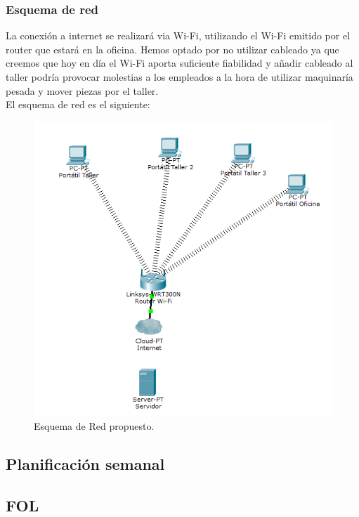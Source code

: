 \documentclass{article}
\begin{document}
\subsubsection{Esquema de red}
La conexión a internet se realizará via Wi-Fi, utilizando el Wi-Fi emitido por el router que estará en la oficina. Hemos optado 
por no utilizar cableado ya que creemos que hoy en día el Wi-Fi aporta suficiente fiabilidad y añadir cableado al taller podría provocar molestias a los empleados a la hora de utilizar 
maquinaría pesada y mover piezas por el taller.\\ 
El esquema de red es el siguiente: 
\begin{figure}[H]
  \centering
  \includegraphics[width=1.0\textwidth]{CapturasSistemas/EsquemaRed.png}
  \caption{Esquema de Red propuesto.}
\end{figure}
\subsection{Planificación semanal}
\subsection{FOL}
\clearpage
\end{document}
